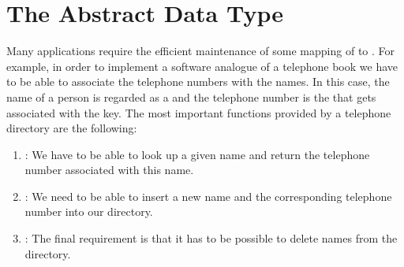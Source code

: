 \section{The Abstract Data Type } 
Many applications require the efficient maintenance of some mapping of  to
.  For example, in order to implement a software analogue of a telephone book we have to
be able to associate the telephone numbers with the names.  In this case, the name of a person is regarded as a
 and the telephone number is the  that gets associated with the key.
The most important functions provided by a telephone directory are the following:
\begin{enumerate}
\item {}: We have to be able to look up a given name and return the telephone number
      associated with this name.
\item {}: We need to be able to insert a new name and the corresponding telephone
      number into our directory.
\item {}: The final requirement is that it has to be possible to delete names from
      the directory.
\end{enumerate}


